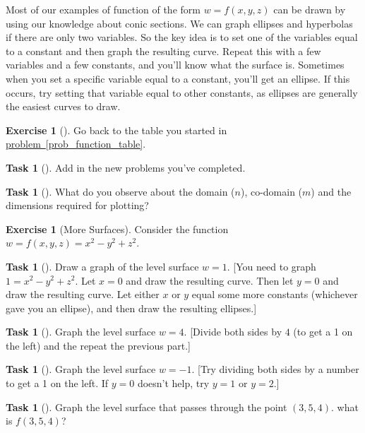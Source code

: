 \documentclass[10pt,]{book}
\theoremstyle{plain}
\theoremstyle{definition}
\theoremstyle{definition}
\theoremstyle{definition}
\theoremstyle{definition}
\newtheorem{exploration}[project]{Exercise}
\newtheorem{task}[project]{Task}
\theoremstyle{definition}
\numberwithin{equation}{section}
\begin{document}
Most of our examples of function of the form \(w=f(x,y,z)\) can be drawn by using our knowledge about conic sections. We can graph ellipses and hyperbolas if there are only two variables. So the key idea is to set one of the variables equal to a constant and then graph the resulting curve. Repeat this with a few variables and a few constants, and you'll know what the surface is. Sometimes when you set a specific variable equal to a constant, you'll get an ellipse. If this occurs, try setting that variable equal to other constants, as ellipses are generally the easiest curves to draw.%
\begin{exploration}[]\label{exploration-116}
Go back to the table you started in \hyperref[prob_function_table]{problem~\ref{prob_function_table}}.%
\begin{task}[]\label{task-231}
Add in the new problems you've completed.%
\end{task}
\begin{task}[]\label{task-232}
What do you observe about the domain (\(n\)), co-domain (\(m\)) and the dimensions required for plotting?%
\end{task}
\end{exploration}
\begin{exploration}[More Surfaces]\label{exploration-117}
Consider the function \(w=f(x,y,z)=x^2-y^2+z^2\). %
\begin{task}[]\label{task-233}
Draw a graph of the level surface \(w=1\). [You need to graph \(1=x^2-y^2+z^2\). Let \(x=0\) and draw the resulting curve. Then let \(y=0\) and draw the resulting curve. Let either \(x\) or \(y\) equal some more constants (whichever gave you an ellipse), and then draw the resulting ellipses.]%
\end{task}
\begin{task}[]\label{task-234}
Graph the level surface \(w=4\). [Divide both sides by \(4\) (to get a 1 on the left) and the repeat the previous part.]%
\end{task}
\begin{task}[]\label{task-235}
Graph the level surface \(w=-1\). [Try dividing both sides by a number to get a 1 on the left. If \(y=0\) doesn't help, try \(y=1\) or \(y=2\).]%
\end{task}
\begin{task}[]\label{task-236}
Graph the level surface that passes through the point \((3,5,4)\). what is \(f(3,5,4)\)?%
%
\end{task}
\end{exploration}
\typeout{************************************************}
\typeout{************************************************}
\end{document}
